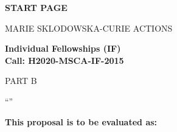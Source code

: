 \phantom{a}
\vspace{15mm}
\begin{center}


        \Large{


        \textbf{START PAGE}

          \vspace{15mm}
          MARIE SKLODOWSKA-CURIE ACTIONS\\
          \vspace{1cm}

          \textbf{Individual Fellowships (IF)}\\
          \textbf{Call: H2020-MSCA-IF-2015}
          \vspace{2cm}

          PART B
          \vspace{2.5cm}

          ``\proposalAcronym''
          \vspace{2cm}

          \textbf{This proposal is to be evaluated as:}
          \vspace{.5cm}

          \textbf{\evaluationPannel}
        }

  \end{center}
\vspace{1cm}

